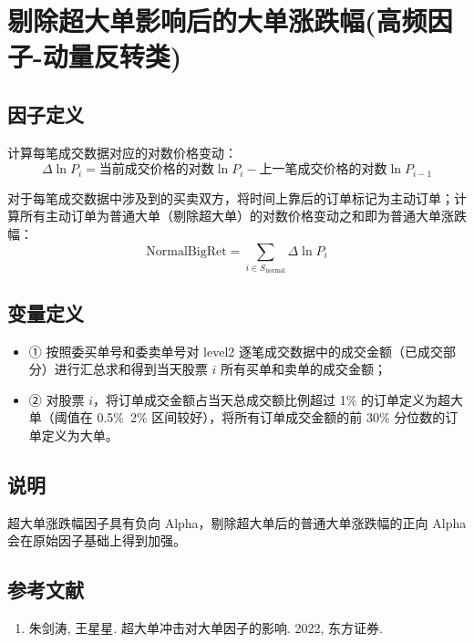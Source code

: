 \documentclass{article}
\begin{document}
\section{剔除超大单影响后的大单涨跌幅(高频因子-动量反转类)}

\subsection{因子定义}

计算每笔成交数据对应的对数价格变动：
\begin{equation}
    \Delta \ln P_i = \text{当前成交价格的对数}\ln P_i - \text{上一笔成交价格的对数}\ln P_{i-1}
\end{equation}

对于每笔成交数据中涉及到的买卖双方，将时间上靠后的订单标记为主动订单；计算所有主动订单为普通大单（剔除超大单）的对数价格变动之和即为普通大单涨跌幅：
\begin{equation}
    \mathrm{NormalBigRet} = \sum_{i \in S_{\mathrm{normal}}} \Delta \ln P_i
\end{equation}

\subsection{变量定义}
\begin{itemize}
    \item ① 按照委买单号和委卖单号对 level2 逐笔成交数据中的成交金额（已成交部分）进行汇总求和得到当天股票 \( i \) 所有买单和卖单的成交金额；
    \item ② 对股票 \( i \)，将订单成交金额占当天总成交额比例超过 1\% 的订单定义为超大单（阈值在 0.5\%~2\% 区间较好），将所有订单成交金额的前 30\% 分位数的订单定义为大单。
\end{itemize}

\subsection{说明}
超大单涨跌幅因子具有负向 Alpha，剔除超大单后的普通大单涨跌幅的正向 Alpha 会在原始因子基础上得到加强。

\subsection{参考文献}
\begin{enumerate}
    \item 朱剑涛, 王星星. 超大单冲击对大单因子的影响. 2022, 东方证券.
\end{enumerate}
\end{document}
